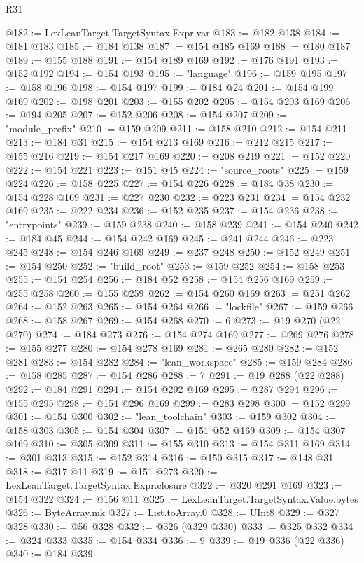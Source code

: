 \begin{lexlean}{R31}
\begin{coremodule}
@182 := LexLeanTarget.TargetSyntax.Expr.var
@183 := @182 @138
@184 := @181 @183
@185 := @184 @138
@187 := @154 @185 @169
@188 := @180 @187
@189 := @155 @188
@191 := @154 @189 @169
@192 := @176 @191
@193 := @152 @192
@194 := @154 @193
@195 := "language"
@196 := @159 @195
@197 := @158 @196
@198 := @154 @197
@199 := @184 @24
@201 := @154 @199 @169
@202 := @198 @201
@203 := @155 @202
@205 := @154 @203 @169
@206 := @194 @205
@207 := @152 @206
@208 := @154 @207
@209 := "module_prefix"
@210 := @159 @209
@211 := @158 @210
@212 := @154 @211
@213 := @184 @31
@215 := @154 @213 @169
@216 := @212 @215
@217 := @155 @216
@219 := @154 @217 @169
@220 := @208 @219
@221 := @152 @220
@222 := @154 @221
@223 := @151 @45
@224 := "source_roots"
@225 := @159 @224
@226 := @158 @225
@227 := @154 @226
@228 := @184 @38
@230 := @154 @228 @169
@231 := @227 @230
@232 := @223 @231
@234 := @154 @232 @169
@235 := @222 @234
@236 := @152 @235
@237 := @154 @236
@238 := "entrypoints"
@239 := @159 @238
@240 := @158 @239
@241 := @154 @240
@242 := @184 @45
@244 := @154 @242 @169
@245 := @241 @244
@246 := @223 @245
@248 := @154 @246 @169
@249 := @237 @248
@250 := @152 @249
@251 := @154 @250
@252 := "build_root"
@253 := @159 @252
@254 := @158 @253
@255 := @154 @254
@256 := @184 @52
@258 := @154 @256 @169
@259 := @255 @258
@260 := @155 @259
@262 := @154 @260 @169
@263 := @251 @262
@264 := @152 @263
@265 := @154 @264
@266 := "lockfile"
@267 := @159 @266
@268 := @158 @267
@269 := @154 @268
@270 := 6
@273 := @19 @270 (@22 @270)
@274 := @184 @273
@276 := @154 @274 @169
@277 := @269 @276
@278 := @155 @277
@280 := @154 @278 @169
@281 := @265 @280
@282 := @152 @281
@283 := @154 @282
@284 := "lean_workspace"
@285 := @159 @284
@286 := @158 @285
@287 := @154 @286
@288 := 7
@291 := @19 @288 (@22 @288)
@292 := @184 @291
@294 := @154 @292 @169
@295 := @287 @294
@296 := @155 @295
@298 := @154 @296 @169
@299 := @283 @298
@300 := @152 @299
@301 := @154 @300
@302 := "lean_toolchain"
@303 := @159 @302
@304 := @158 @303
@305 := @154 @304
@307 := @151 @52 @169
@309 := @154 @307 @169
@310 := @305 @309
@311 := @155 @310
@313 := @154 @311 @169
@314 := @301 @313
@315 := @152 @314
@316 := @150 @315
@317 := @148 @31
@318 := @317 @11
@319 := @151 @273
@320 := LexLeanTarget.TargetSyntax.Expr.closure
@322 := @320 @291 @169
@323 := @154 @322
@324 := @156 @11
@325 := LexLeanTarget.TargetSyntax.Value.bytes
@326 := ByteArray.mk
@327 := List.toArray.{0}
@328 := UInt8
@329 := @327 @328
@330 := @56 @328
@332 := @326 (@329 @330)
@333 := @325 @332
@334 := @324 @333
@335 := @154 @334
@336 := 9
@339 := @19 @336 (@22 @336)
@340 := @184 @339

\end{coremodule}
\end{lexlean}
